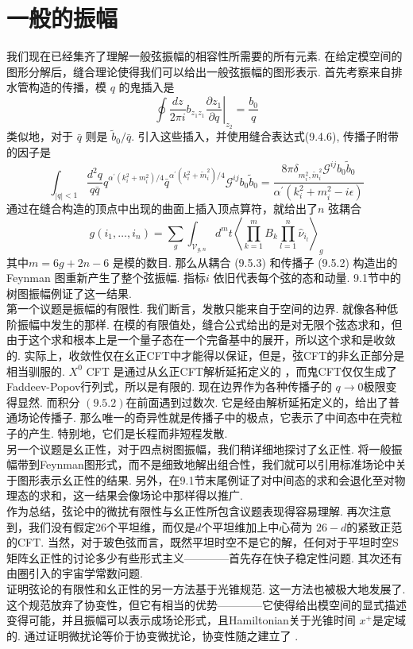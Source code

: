 \section{一般的振幅}%
我们现在已经集齐了理解一般弦振幅的相容性所需要的所有元素. 在给定模空间的图形分解后，缝合理论使得我们可以给出一般弦振幅的图形表示. 首先考察来自排水管构造的传播，模 $q$ 的鬼插入是
\begin{equation}
	\left.\oint \frac{d z}{2 \pi i} b_{z_{1} z_{1}} \frac{\partial z_{1}}{\partial q}\right|_{z_{2}}=\frac{b_{0}}{q}
\end{equation}
类似地，对于 $\bar{q}$ 则是 $\tilde{b}_{0} / \bar{q}$. 引入这些插入，并使用缝合表达式(9.4.6), 传播子附带的因子是
\begin{equation}
	\int_{|q|<1} \frac{d^{2} q}{q \bar{q}} q^{\alpha^{\prime}\left(k_{i}^{2}+m_{i}^{2}\right) / 4} \bar{q}^{\alpha^{\prime}\left(k_{i}^{2}+\tilde{m}_{i}^{2}\right) / 4} \mathscr{G}^{i j} b_{0} \tilde{b}_{0}=\frac{8 \pi \delta_{m_{i}^{2}, \tilde{m}_{i}^{2}} \mathscr{G}^{i j} b_{0} \tilde{b}_{0}}{\alpha^{\prime}\left(k_{i}^{2}+m_{i}^{2}-i \epsilon\right)}
\end{equation}
通过在缝合构造的顶点中出现的曲面上插入顶点算符，就给出了$n$ 弦耦合
\begin{equation}
	g\left(i_{1}, \ldots, i_{n}\right)=\sum_{g} \int_{\mathscr{V}_{g, n}} d^{m} t\left\langle\prod_{k=1}^{m} B_{k} \prod_{l=1}^{n} \hat{\nu}_{i_{l}}\right\rangle_{g}
\end{equation}
其中$m=6 g+2 n-6$ 是模的数目. 那么从耦合 (9.5.3) 和传播子 (9.5.2) 构造出的 Feynman 图重新产生了整个弦振幅. 指标$i$ 依旧代表每个弦的态和动量. 9.1节中的树图振幅例证了这一结果.\\
第一个议题是振幅的有限性. 我们断言，发散只能来自于空间的边界. 就像各种低阶振幅中发生的那样. 在模的有限值处，缝合公式给出的是对无限个弦态求和，但由于这个求和根本上是一个量子态在一个完备基中的展开，所以这个求和是收敛的. 实际上，收敛性仅在幺正CFT中才能得以保证，但是，弦CFT的非幺正部分是相当驯服的. $X^{0}$ CFT 是通过从幺正CFT解析延拓定义的  ，而鬼CFT仅仅生成了Faddeev-Popov行列式，所以是有限的. 现在边界作为各种传播子的  $q \rightarrow 0$极限变得显然. 而积分 $(9.5 .2)$在前面遇到过数次. 它是经由解析延拓定义的，给出了普通场论传播子. 那么唯一的奇异性就是传播子中的极点，它表示了中间态中在壳粒子的产生. 特别地，它们是长程而非短程发散. \\
另一个议题是幺正性，对于四点树图振幅，我们稍详细地探讨了幺正性. 将一般振幅带到Feynman图形式，而不是细致地解出组合性，我们就可以引用标准场论中关于图形表示幺正性的结果. 另外，在9.1节末尾例证了对中间态的求和会退化至对物理态的求和，这一结果会像场论中那样得以推广. \\
作为总结，弦论中的微扰有限性与幺正性所包含议题表现得容易理解. 再次注意到，我们没有假定26个平坦维，而仅是$d$个平坦维加上中心荷为 $26-d$的紧致正范的CFT. 当然，对于玻色弦而言，既然平坦时空不是它的解，任何对于平坦时空S矩阵幺正性的讨论多少有些形式主义————首先存在快子稳定性问题. 其次还有由圈引入的宇宙学常数问题.\\
证明弦论的有限性和幺正性的另一方法基于光锥规范. 这一方法也被极大地发展了. 这个规范放弃了协变性，但它有相当的优势————它使得给出模空间的显式描述变得可能，并且振幅可以表示成场论形式，且Hamiltonian关于光锥时间 $x^{+}$是定域的. 通过证明微扰论等价于协变微扰论，协变性随之建立了 .

